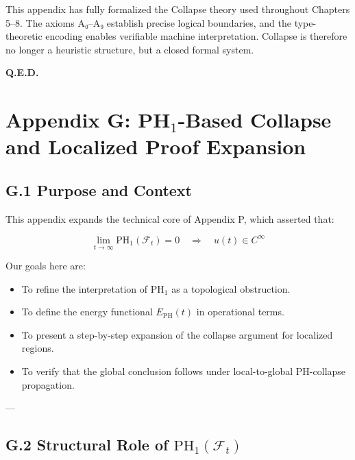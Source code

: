 \documentclass[11pt]{article}
\begin{document}
This appendix has fully formalized the Collapse theory used throughout Chapters 5–8.  
The axioms A₀–A₉ establish precise logical boundaries,  
and the type-theoretic encoding enables verifiable machine interpretation.  
Collapse is therefore no longer a heuristic structure, but a closed formal system.

\begin{flushright}
\textbf{Q.E.D.}
\end{flushright}




\section*{Appendix G: PH\(_1\)-Based Collapse and Localized Proof Expansion}

\subsection*{G.1 Purpose and Context}

This appendix expands the technical core of Appendix P, which asserted that:

\[
\lim_{t \to \infty} \mathrm{PH}_1(\mathcal{F}_t) = 0 \quad \Rightarrow \quad u(t) \in C^\infty
\]

Our goals here are:

\begin{itemize}
  \item To refine the interpretation of \( \mathrm{PH}_1 \) as a topological obstruction.
  \item To define the energy functional \( E_{\mathrm{PH}}(t) \) in operational terms.
  \item To present a step-by-step expansion of the collapse argument for localized regions.
  \item To verify that the global conclusion follows under local-to-global PH-collapse propagation.
\end{itemize}

---

\subsection*{G.2 Structural Role of \( \mathrm{PH}_1(\mathcal{F}_t) \)}
\end{document}
